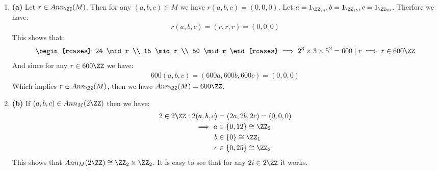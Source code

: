 \begin{enumerate}[label=]
    \item 
        \textbf{(a)}
        Let $r \in Ann_\ZZ(M)$. Then for any $(a, b, c) \in M$ we have $r(a, b, c) = (0, 0 , 0)$. Let $a = 1_{\ZZ_{24}}, b = 1_{\ZZ_{15}}, c = 1_{\ZZ_{50}}$. Therfore we have:
        \begin{gather*}
            r(a, b, c) = (r, r, r) = (0, 0, 0)
        \end{gather*}
        This shows that:
        \begin{gather*}
            \begin{rcases}
                24 \mid r \\
                15 \mid r \\
                50 \mid r
            \end{rcases} \implies 2^3 \times 3 \times 5^2 = 600 \mid r \implies r \in 600\ZZ
        \end{gather*}
        And since for any $r \in 600\ZZ$ we have:
        \begin{gather*}
            600(a, b, c) = (600a, 600b, 600c) = (0, 0, 0)
        \end{gather*}
        Which implies $r \in Ann_\ZZ(M)$, then we have $Ann_\ZZ(M) = 600\ZZ$.
    \item
        \textbf{(b)}
        If $(a, b, c) \in Ann_M(2\ZZ)$ then we have:
        \begin{gather*}
            \begin{split}
                2 \in 2\ZZ : 2(a, b, c) & = (2a, 2b, 2c) = (0, 0, 0) \\
                \implies a & \in \{0, 12\} \cong \ZZ_2 \\
                b & \in \{0\} \cong \ZZ_1 \\
                c & \in \{0, 25\} \cong \ZZ_2
            \end{split}
        \end{gather*}
        This shows that $Ann_M(2\ZZ) \cong \ZZ_2 \times \ZZ_2$. It is easy to see that for any $2i \in 2\ZZ$ it works.
\end{enumerate}